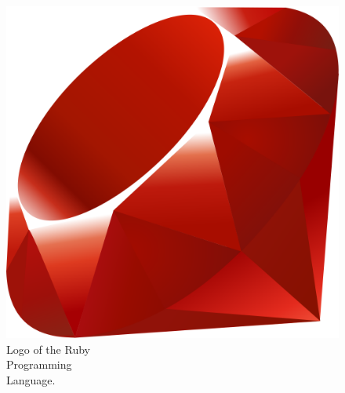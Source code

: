 \begin{figure} %
    \centering
    \includegraphics[width=\linewidth]{images/ruby.png}
    \caption{Logo of the Ruby\\Programming\\Language.}
\end{figure}

